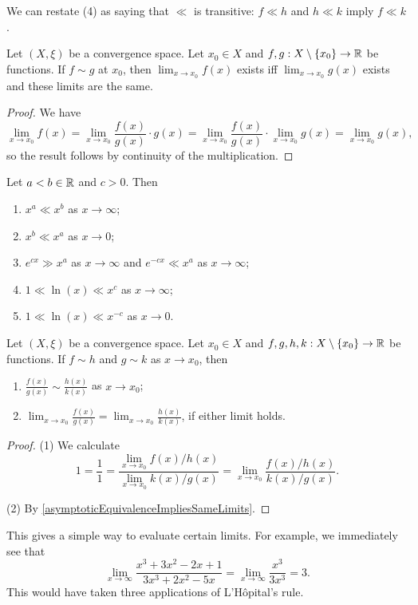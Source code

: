 We can restate (4) as saying that $\ll$ is transitive: $f\ll h$ and $h \ll k$ imply $f \ll k$.

\begin{lemma} \label{asymptoticEquivalenceImpliesSameLimits}
Let $(X,\xi)$ be a convergence space. Let $x_0 \in X$ and $f,g: X\setminus\{x_0\}\to \mathbb{R}$ be functions. If $f \sim g$ at $x_0$, then $\lim_{x\to x_0} f(x)$ exists iff $\lim_{x\to x_0} g(x)$ exists and these limits are the same.
\end{lemma}
\begin{proof}
We have
\[ \lim_{x\to x_0} f(x) = \lim_{x\to x_0} \frac{f(x)}{g(x)}\cdot g(x) = \lim_{x\to x_0} \frac{f(x)}{g(x)}\cdot \lim_{x\to x_0} g(x) = \lim_{x\to x_0} g(x), \]
so the result follows by continuity of the multiplication.
\end{proof}

\begin{lemma}
Let $a<b \in \mathbb{R}$ and $c > 0$. Then
\begin{enumerate}
\item $x^a \ll x^b$ as $x\to \infty$;
\item $x^b \ll x^a$ as $x\to 0$;
\item $e^{cx} \gg x^a$ as $x\to \infty$ and $e^{-cx} \ll x^a$ as $x\to \infty$;
\item $1 \ll \ln(x) \ll x^c$ as $x\to \infty$;
\item $1 \ll \ln(x) \ll x^{-c}$ as $x\to 0$.
\end{enumerate}
\end{lemma}

\begin{proposition} \label{asymptoticEquivalenceQuotient}
Let $(X,\xi)$ be a convergence space. Let $x_0 \in X$ and $f,g,h,k: X\setminus\{x_0\}\to \mathbb{R}$ be functions. If $f \sim h$ and $g\sim k$ as $x\to x_0$, then
\begin{enumerate}
\item $\displaystyle \frac{f(x)}{g(x)} \sim \frac{h(x)}{k(x)}$ as $x\to x_0$;
\item $\displaystyle \lim_{x\to x_0}\frac{f(x)}{g(x)} = \lim_{x\to x_0}\frac{h(x)}{k(x)}$, if either limit holds.
\end{enumerate}
\end{proposition}
\begin{proof}
(1) We calculate
\[ 1 = \frac{1}{1} = \frac{\lim_{x\to x_0}f(x) / h(x)}{\lim_{x\to x_0}k(x) / g(x)} = \lim_{x\to x_0}\frac{f(x) / h(x)}{k(x) / g(x)}.  \]

(2) By \ref{asymptoticEquivalenceImpliesSameLimits}.
\end{proof}
\begin{example}
This gives a simple way to evaluate certain limits. For example, we immediately see that
\[ \lim_{x\to \infty}\frac{x^3 + 3x^2 - 2x +1}{3x^3 + 2x^2 -5x} = \lim_{x\to \infty}\frac{x^3}{3x^3} = 3. \]
This would have taken three applications of L'Hôpital's rule.
\end{example}

